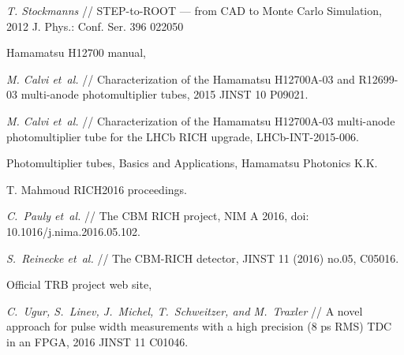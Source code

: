\begin{thebibliography}{99}

\textit{T. Stockmanns} //
STEP-to-ROOT --- from CAD to Monte Carlo Simulation,
2012 J. Phys.: Conf. Ser. 396 022050


Hamamatsu H12700 manual,

\textit{M. Calvi et~al.} //
Characterization of the Hamamatsu H12700A-03 and R12699-03 multi-anode photomultiplier tubes,
2015 JINST 10 P09021.

\textit{M. Calvi et~al.} //
Characterization of the Hamamatsu H12700A-03 multi-anode photomultiplier tube for the LHCb RICH upgrade,
LHCb-INT-2015-006.



Photomultiplier tubes, Basics and Applications, Hamamatsu Photonics K.K.

T. Mahmoud RICH2016 proceedings.

\textit{C.~Pauly et~al.} //
The CBM RICH project,
NIM A 2016,
doi: 10.1016/j.nima.2016.05.102.

\textit{S.~Reinecke et~al.} //
The CBM-RICH detector,
JINST 11 (2016) no.05, C05016.

Official TRB project web site,

\textit{C.~Ugur, S.~Linev, J.~Michel, T.~Schweitzer, and M.~Traxler} //
A novel approach for pulse width measurements with a high precision (8 ps RMS) TDC in an FPGA,
2016 JINST 11 C01046.


\end{thebibliography}
